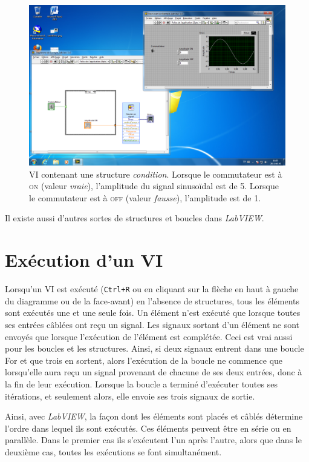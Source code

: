 \documentclass[12pt,oneside,letterpaper]{article}
\begin{document}
\begin{figure}[h]
\includegraphics[width=\textwidth]{A classer/LabVIEW-3.png}
\caption{\label{Pauling}VI contenant une structure \textit{condition}. Lorsque le commutateur est à \textsc{on} (valeur \textit{vraie}), l'amplitude du signal sinusoïdal est de 5. Lorsque le commutateur est à \textsc{off} (valeur \textit{fausse}), l'amplitude est de 1.}
\end{figure}

Il existe aussi d'autres sortes de structures et boucles dans \textit{LabVIEW}.


\section{Exécution d'un VI}

Lorsqu'un VI est exécuté (\texttt{Ctrl+R} ou en cliquant sur la flèche en haut à gauche du diagramme ou de la face-avant) en l'absence de structures, tous les éléments sont exécutés une et une seule fois. Un élément n'est exécuté que lorsque toutes ses entrées câblées ont reçu un signal. Les signaux sortant d'un élément ne sont envoyés que lorsque l'exécution de l'élément est complétée. Ceci est vrai aussi pour les boucles et les structures. Ainsi, si deux signaux entrent dans une boucle For et que trois en sortent, alors l'exécution de la boucle ne commence que lorsqu'elle aura reçu un signal provenant de chacune de ses deux entrées, donc à la fin de leur exécution. Lorsque la boucle a terminé d'exécuter toutes ses itérations, et seulement alors, elle envoie ses trois signaux de sortie.

Ainsi, avec \textit{LabVIEW}, la façon dont les éléments sont placés et câblés détermine l'ordre dans lequel ils sont exécutés. Ces éléments peuvent être en série ou en parallèle. Dans le premier cas ils s'exécutent l'un après l'autre, alors que dans le deuxième cas, toutes les exécutions se font simultanément.
\end{document}
